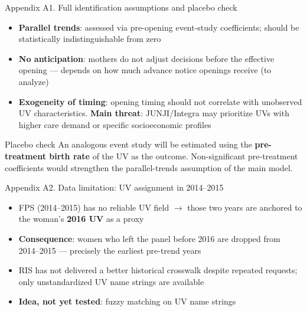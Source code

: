 \documentclass[aspectratio=169,10pt]{beamer}
\begin{document}
\begin{frame}{Appendix A1. Full identification assumptions and placebo check}
\begin{itemize}
  \item \textbf{Parallel trends}: assessed via pre-opening event-study coefficients; should be statistically indistinguishable from zero
  \item \textbf{No anticipation}: mothers do not adjust decisions before the effective opening --- depends on how much advance notice openings receive (to analyze)
  \item \textbf{Exogeneity of timing}: opening timing should not correlate with unobserved UV characteristics. \textbf{Main threat}: JUNJI/Integra may prioritize UVs with higher care demand or specific socioeconomic profiles
\end{itemize}

\vspace{10pt}
\begin{block}{Placebo check}
\small An analogous event study will be estimated using the \textbf{pre-treatment birth rate} of the UV as the outcome. Non-significant pre-treatment coefficients would strengthen the parallel-trends assumption of the main model.
\end{block}
\end{frame}

\begin{frame}{Appendix A2. Data limitation: UV assignment in 2014--2015}
\begin{itemize}
  \item FPS (2014--2015) has no reliable UV field $\to$ those two years are anchored to the woman's \textbf{2016 UV} as a proxy
  \item \textbf{Consequence}: women who left the panel before 2016 are dropped from 2014--2015 --- precisely the earliest pre-trend years
  \item RIS has not delivered a better historical crosswalk despite repeated requests; only unstandardized UV name strings are available
  \item \textbf{Idea, not yet tested}: fuzzy matching on UV name strings
\end{itemize}
\end{frame}
\end{document}
